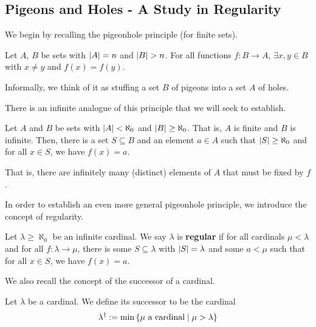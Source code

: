 \subsection{Pigeons and Holes - A Study in Regularity}

We begin by recalling the pigeonhole principle (for finite sets).

\begin{boxtheorem}
    Let $A$, $B$ be sets with $\left\lvert A \right\rvert = n$ and $\left\lvert B \right\rvert > n$. For all functions $f : B \to A$, $\exists x, y \in B$ with $x \neq y$ and $f(x) = f(y)$.
\end{boxtheorem}

Informally, we think of it as stuffing a set $B$ of pigeons into a set $A$ of holes.

There is an infinite analogue of this principle that we will seek to establish.

\begin{boxtheorem}
    Let $A$ and $B$ be sets with $\left\lvert A \right\rvert < \aleph_0$ and $\left\lvert B \right\rvert \geq \aleph_0$. That is, $A$ is finite and $B$ is infinite. Then, there is a set $S \subseteq B$ and an element $a \in A$ such that $\left\lvert S \right\rvert \geq \aleph_0$ and for all $x \in S$, we have $f(x) = a$.
\end{boxtheorem}

That is, there are infinitely many (distinct) elements of $A$ that must be fixed by $f$.

In order to establish an even more general pigeonhole principle, we introduce the concept of regularity.

\begin{boxdefinition}
    Let $\lambda \geq \aleph_0$ be an infinite cardinal. We say $\lambda$ is \textbf{regular} if for all cardinals $\mu < \lambda$ and for all $f : \lambda \to \mu$, there is some $S \subseteq \lambda$ with $\left\lvert S \right\rvert = \lambda$ and some $a < \mu$ such that for all $x \in S$, we have $f(x) = a$.
\end{boxdefinition}

We also recall the concept of the successor of a cardinal.

\begin{boxdefinition}
    Let $\lambda$ be a cardinal. We define its successor to be the cardinal
    \begin{align*}
        \lambda^{\dagger} := \min\left\{ \mu \text{ a cardinal} \; \middle\vert \; \mu > \lambda \right\}
    \end{align*}
\end{boxdefinition}

